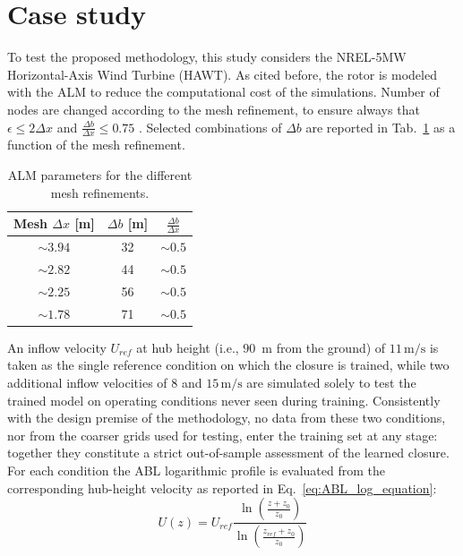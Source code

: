 \section{Case study}
\label{sec:case_study}
To test the proposed methodology, this study considers the NREL-5MW \cite{NREL_5MW} Horizontal-Axis Wind Turbine (HAWT). As cited before, the rotor is modeled with the ALM to reduce the computational cost of the simulations. Number of nodes are changed according to the mesh refinement, to ensure always that $\epsilon \le 2\Delta x$ and $\frac{\Delta b}{\Delta x} \le 0.75$ \cite{inproceedings}. Selected combinations of $\Delta b$ are reported in Tab.~\ref{tab:ALM_parameters} as a function of the mesh refinement.
\begin{table}[h]
    \centering
    \begin{tabular}{c|c|c}
        \textbf{Mesh $\Delta x$ [m]} & $\Delta b$ [m] & $\frac{\Delta b}{\Delta x}$ \\
        \hline
        $\sim 3.94$ & 32 & $\sim0.5$ \\
        $\sim 2.82$ & 44 & $\sim0.5$ \\    
        $\sim 2.25$ & 56 & $\sim0.5$ \\
        $\sim 1.78$ & 71 & $\sim0.5$ \\
    \end{tabular}
    \caption{ALM parameters for the different mesh refinements.}
    \label{tab:ALM_parameters}
\end{table}
An inflow velocity $U_{ref}$ at hub height (i.e., $90$~m from the ground) of $11\,\mathrm{m/s}$ is taken as the single reference condition on which the closure is trained, while two additional inflow velocities of $8$ and $15\,\mathrm{m/s}$ are simulated solely to test the trained model on operating conditions never seen during training. Consistently with the design premise of the methodology, no data from these two conditions, nor from the coarser grids used for testing, enter the training set at any stage: together they constitute a strict out-of-sample assessment of the learned closure. For each condition the ABL logarithmic profile is evaluated from the corresponding hub-height velocity as reported in Eq.~\ref{eq:ABL_log_equation}:
\begin{equation}
    U(z) = U_{ref} \frac{\ln(\frac{z+z_0}{z_0})}{\ln(\frac{z_{ref}+z_0}{z_0})}
    \label{eq:ABL_log_equation}
\end{equation}

